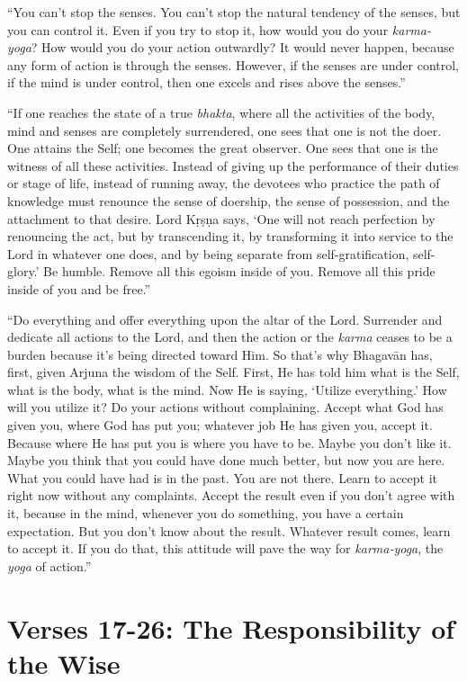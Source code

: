 \enquote{You can’t stop the senses. You can’t stop the natural tendency of the senses, but you can control it. Even if you try to stop it, how would you do your \textit{karma-yoga}? How would you do your action outwardly? It would never happen, because any form of action is through the senses. However, if the senses are under control, if the mind is under control, then one excels and rises above the senses.}

\enquote{If one reaches the state of a true \textit{bhakta}, where all the activities of the body, mind and senses are completely surrendered, one sees that one is not the doer. One attains the Self; one becomes the great observer. One sees that one is the witness of all these activities. Instead of giving up the performance of their duties or stage of life, instead of running away, the devotees who practice the path of knowledge must renounce the sense of doership, the sense of possession, and the attachment to that desire. Lord Kṛṣṇa says, \enquote{One will not reach perfection by renouncing the act, but by transcending it, by transforming it into service to the Lord in whatever one does, and by being separate from self-gratification, self-glory.} Be humble. Remove all this egoism inside of you. Remove all this pride inside of you and be free.}

\enquote{Do everything and offer everything upon the altar of the Lord. Surrender and dedicate all actions to the Lord, and then the action or the \textit{karma} ceases to be a burden because it’s being directed toward Him. So that’s why Bhagavān has, first, given Arjuna the wisdom of the Self. First, He has told him what is the Self, what is the body, what is the mind. Now He is saying, \enquote{Utilize everything.} How will you utilize it? Do your actions without complaining. Accept what God has given you, where God has put you; whatever job He has given you, accept it. Because where He has put you is where you have to be. Maybe you don’t like it. Maybe you think that you could have done much better, but now you are here. What you could have had is in the past. You are not there. Learn to accept it right now without any complaints. Accept the result even if you don’t agree with it, because in the mind, whenever you do something, you have a certain expectation. But you don’t know about the result. Whatever result comes, learn to accept it. If you do that, this attitude will pave the way for \textit{karma-yoga}, the \textit{yoga} of action.}

\section{Verses 17-26: The Responsibility of the Wise}\label{sec-verses-17-26-the-responsibility-of-the-wise}

